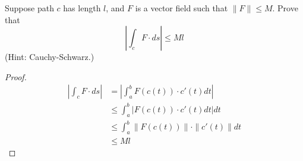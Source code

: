 \documentclass[openany]{book}
\begin{document}
\begin{prob}
    Suppose path $c$ has length $l$, and $F$ is a vector field such that $\|F\|\leq M$. Prove that 
    \begin{equation*}
        \left|\int_c F\cdot ds\right|\leq Ml
    \end{equation*}
    (Hint: Cauchy-Schwarz.)
\end{prob}
\begin{proof}
    \begin{align*}
        \left|\int_cF\cdot ds\right|&=\left|\int_a^b F(c(t))\cdot c'(t)dt\right|\\
        &\leq\int_a^b\left|F(c(t))\cdot c'(t)dt\right|dt\\
        &\leq\int_a^b\|F(c(t))\|\cdot\|c'(t)\|dt\\
        &\leq Ml
    \end{align*}
\end{proof}
\end{document}
